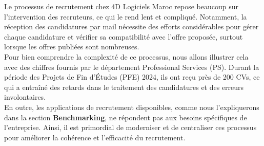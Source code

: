 Le processus de recrutement chez 4D Logiciels Maroc repose beaucoup sur l'intervention des recruteurs, ce qui le rend lent et compliqué. 
Notamment, la réception des candidatures par mail nécessite des efforts considérables pour gérer chaque candidature et vérifier sa compatibilité 
avec l'offre proposée, surtout lorsque les offres publiées sont nombreuses.
\\
Pour bien comprendre la complexité de ce processus, nous allons illustrer cela avec des chiffres fournis par le département Professional 
Services (PS). Durant la période des Projets de Fin d'Études (PFE) 2024, ils ont reçu près de 200 CVs, ce qui a entraîné des retards dans 
le traitement des candidatures et des erreurs involontaires.
\\

En outre, les applications de recrutement disponibles, comme nous l'expliquerons dans la section \textbf{Benchmarking}, 
ne répondent pas aux besoins spécifiques de l'entreprise. Ainsi, il est primordial de moderniser et de centraliser ces processus pour améliorer 
la cohérence et l'efficacité du recrutement.




